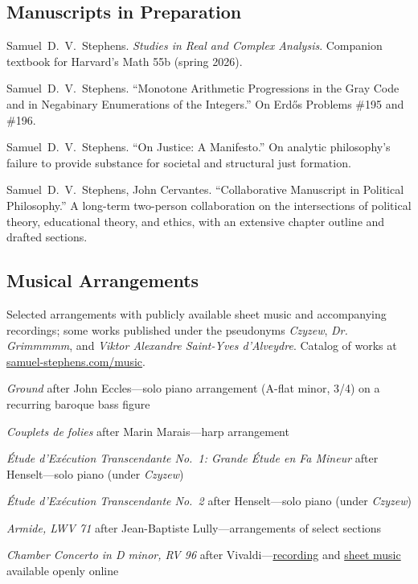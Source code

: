 \documentclass[11pt,letterpaper]{report} %
\newcommand{\listitemspace}{0.25em}
\renewenvironment{itemize}
{\begin{list}{}{\setlength{\leftmargin}{0em}
                \setlength{\parskip}{0em}
                \setlength{\itemsep}{\listitemspace}
                \setlength{\parsep}{\listitemspace}}}
{\end{list}}
\begin{document}
    \subsection*{Manuscripts in Preparation}
    \begin{tablist}
        \item[2026--]   \tab{}Samuel~D.~V.\ Stephens. \textit{Studies in Real and Complex Analysis}. Companion textbook for Harvard's Math 55b (spring 2026).
        \item[2026--]   \tab{}Samuel~D.~V.\ Stephens. \enquote{Monotone Arithmetic Progressions in the Gray Code and in Negabinary Enumerations of the Integers.} On Erdős Problems \#195 and \#196.
        \item[2026--]   \tab{}Samuel~D.~V.\ Stephens. \enquote{On Justice: A Manifesto.} On analytic philosophy's failure to provide substance for societal and structural just formation.
        \item[2024--]   \tab{}Samuel~D.~V.\ Stephens, John Cervantes. \enquote{Collaborative Manuscript in Political Philosophy.} A long-term two-person collaboration on the intersections of political theory, educational theory, and ethics, with an extensive chapter outline and drafted sections.
    \end{tablist}

    \subsection*{Musical Arrangements}
    Selected arrangements with publicly available sheet music and accompanying recordings; some works published under the pseudonyms \textit{Czyzew}, \textit{Dr. Grimmmmm}, and \textit{Viktor Alexandre Saint-Yves d'Alveydre}. Catalog of works at \href{https://www.samuel-stephens.com/music}{samuel-stephens.com/music}.
    \begin{itemize}
        \item \textit{Ground} after John Eccles---solo piano arrangement (A-flat minor, 3/4) on a recurring baroque bass figure
        \item \textit{Couplets de folies} after Marin Marais---harp arrangement
        \item \textit{\'Etude d'Ex\'ecution Transcendante No.~1: Grande \'Etude en Fa Mineur} after Henselt---solo piano (under \textit{Czyzew})
        \item \textit{\'Etude d'Ex\'ecution Transcendante No.~2} after Henselt---solo piano (under \textit{Czyzew})
        \item \textit{Armide, LWV 71} after Jean-Baptiste Lully---arrangements of select sections
        \item \textit{Chamber Concerto in D minor, RV 96} after Vivaldi---\href{https://www.youtube.com/watch?v=MfAI0IuN4n8}{recording} and \href{https://musescore.com/user/35512053/scores/6702147}{sheet music} available openly online
    \end{itemize}
\end{document}

